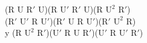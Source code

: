 (R U $\text{R}'$ U)(R $\text{U}'$ $\text{R}'$ U)(R $\text{U}^2$ $\text{R}'$)\\
($\text{R}'$ $\text{U}'$ R $\text{U}'$)($\text{R}'$ U R $\text{U}'$)($\text{R}'$ $\text{U}^2$ R)\\
y (R $\text{U}^2$ $\text{R}'$)($\text{U}'$ R U $\text{R}'$)($\text{U}'$ R $\text{U}'$ $\text{R}'$)\\
